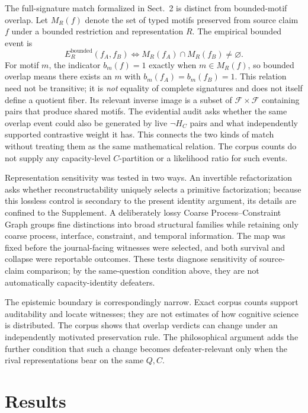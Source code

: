 \documentclass[11pt]{article}
\begin{document}
The full-signature match formalized in Sect.~2 is distinct from bounded-motif overlap. Let \(M_R(f)\) denote the set of typed motifs preserved from source claim \(f\) under a bounded restriction and representation \(R\). The empirical bounded event is
\begin{equation}
E_R^{\mathrm{bounded}}(f_A,f_B)
\iff M_R(f_A)\cap M_R(f_B)\ne\varnothing.
\label{eq:m28-bounded}
\end{equation}
For motif \(m\), the indicator \(b_m(f)=1\) exactly when \(m\in M_R(f)\), so bounded overlap means there exists an \(m\) with \(b_m(f_A)=b_m(f_B)=1\). This relation need not be transitive; it is \emph{not} equality of complete signatures and does not itself define a quotient fiber. Its relevant inverse image is a subset of \(\mathcal F\times\mathcal F\) containing pairs that produce shared motifs. The evidential audit asks whether the same overlap event could also be generated by live \(\neg H_C\) pairs and what independently supported contrastive weight it has. This connects the two kinds of match without treating them as the same mathematical relation. The corpus counts do not supply any capacity-level \(C\)-partition or a likelihood ratio for such events.

Representation sensitivity was tested in two ways. An invertible refactorization asks whether reconstructability uniquely selects a primitive factorization; because this lossless control is secondary to the present identity argument, its details are confined to the Supplement. A deliberately lossy Coarse Process--Constraint Graph groups fine distinctions into broad structural families while retaining only coarse process, interface, constraint, and temporal information. The map was fixed before the journal-facing witnesses were selected, and both survival and collapse were reportable outcomes. These tests diagnose sensitivity of source-claim comparison; by the same-question condition above, they are not automatically capacity-identity defeaters.

The epistemic boundary is correspondingly narrow. Exact corpus counts support auditability and locate witnesses; they are not estimates of how cognitive science is distributed. The corpus shows that overlap verdicts can change under an independently motivated preservation rule. The philosophical argument adds the further condition that such a change becomes defeater-relevant only when the rival representations bear on the same \(Q,C\).

\section{Results}
\end{document}

